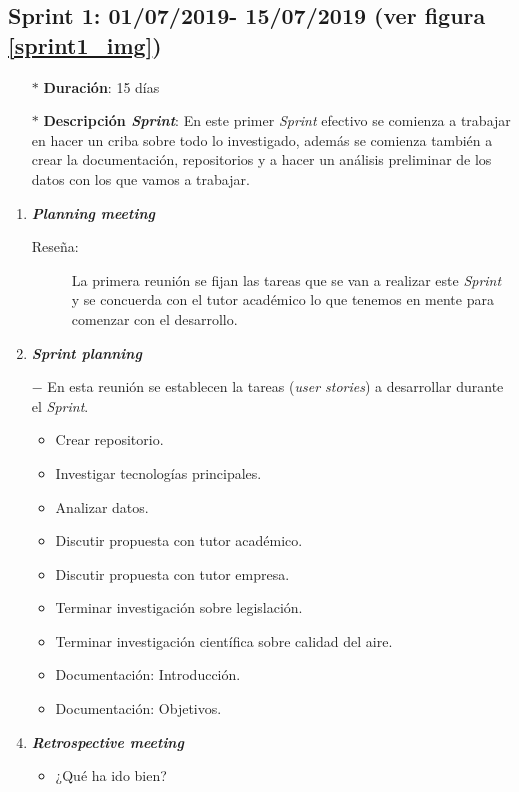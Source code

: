 \subsection{Sprint 1: 01/07/2019- 15/07/2019 (ver figura \ref{sprint1_img})}\label{sprint1}
\begin{itemize}
\item[$\ast$] \textbf{Duración}:  15 días
\item[$\ast$] \textbf{Descripción \textit{Sprint}}: En este primer \textit{Sprint} efectivo se comienza a trabajar en hacer un criba sobre todo lo investigado, además se comienza también a crear la documentación, repositorios y a hacer un análisis preliminar de los datos con los que vamos a trabajar.
\end{itemize}
\begin{enumerate}
	\item \textbf{\textit{Planning meeting}}
	\begin{description}
		\item[Reseña:] La primera reunión se fijan las tareas que se van a realizar este \textit{Sprint} y se concuerda con el tutor académico lo que tenemos en mente para comenzar con el desarrollo.
	\end{description}
	\item \textbf{\textit{Sprint planning}}
	\item[$-$] En esta reunión se establecen la tareas (\textit{user stories}) a desarrollar durante el \textit{Sprint}. 
	\begin{itemize}
		\item Crear repositorio.
		\item Investigar tecnologías principales.
		\item Analizar datos.
		\item Discutir propuesta con tutor académico.
		\item Discutir propuesta con tutor empresa.
		\item Terminar investigación sobre legislación.
		\item Terminar investigación científica sobre calidad del aire.
		\item Documentación: Introducción.
		\item Documentación: Objetivos.
	\end{itemize}
	\item \textbf{\textit{Retrospective meeting}}
	\begin{itemize}
		\item ¿Qué ha ido bien?
		\begin{itemize}

\end{itemize}
\end{itemize}
\end{enumerate}
